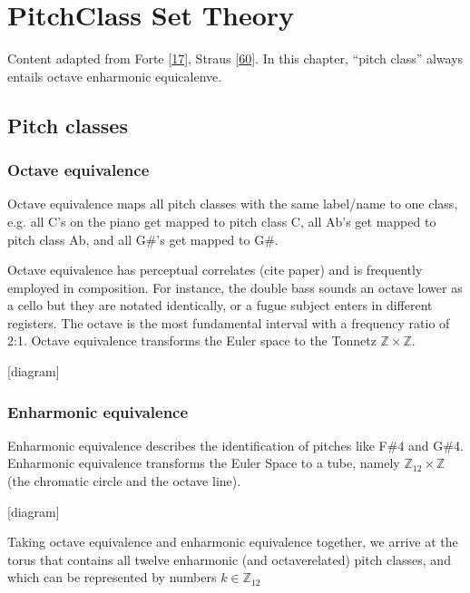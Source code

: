 \documentclass[letterpaper,10pt,english]{sphinxmanual}
\begin{document}
\chapter{Pitch\sphinxhyphen{}Class Set Theory}
\label{\detokenize{3_set_theory:pitch-class-set-theory}}\label{\detokenize{3_set_theory::doc}}
\sphinxAtStartPar
Content adapted from Forte {[}\hyperlink{cite.8_bibliography:id25}{17}{]}, Straus {[}\hyperlink{cite.8_bibliography:id3}{60}{]}.
In this chapter, “pitch class” always entails octave  enharmonic equicalenve.


\section{Pitch classes}
\label{\detokenize{3_set_theory:pitch-classes}}

\subsection{Octave equivalence}
\label{\detokenize{3_set_theory:octave-equivalence}}
\sphinxAtStartPar
Octave equivalence maps all pitch classes with the same label/name to one class,
e.g. all C’s on the piano get mapped to pitch class C, all Ab’s get mapped to pitch class Ab,
and all G\#’s get mapped to G\#.

\sphinxAtStartPar
Octave equivalence has perceptual correlates (cite paper) and is frequently employed in composition.
For instance, the double bass sounds an octave lower as a cello but they are notated identically,
or a fugue subject enters in different registers.
The octave is the most fundamental interval with a frequency ratio of 2:1.
Octave equivalence transforms the Euler space to the Tonnetz \(\mathbb{Z}\times\mathbb{Z}\).

\sphinxAtStartPar
{[}diagram{]}


\subsection{Enharmonic equivalence}
\label{\detokenize{3_set_theory:enharmonic-equivalence}}
\sphinxAtStartPar
Enharmonic equivalence describes the identification of pitches like F\#4 and G\#4.
Enharmonic equivalence transforms the Euler Space to a tube, namely \(\mathbb{Z}_{12} \times \mathbb{Z}\)
(the chromatic circle and the octave line).

\sphinxAtStartPar
{[}diagram{]}

\sphinxAtStartPar
Taking octave equivalence and enharmonic equivalence together,
we arrive at the torus that contains all twelve enharmonic (and octave\sphinxhyphen{}related) pitch classes,
and which can be represented by numbers \(k\in \mathbb{Z}_{12}\)
\end{document}
